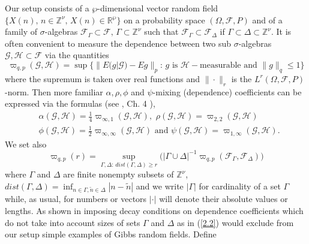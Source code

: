 Our setup consists of a  $\wp$-dimensional vector random field
$\{X(n),\, n\in{{\mathbb Z}}^\nu,\, X(n)\in{{\mathbb R}}^\wp\}$ on a probability space $({{\Omega}},{{\mathcal F}},P)$ and of a family of
${{\sigma}}$-algebras ${{\mathcal F}}_{{\Gamma}}\subset{{\mathcal F}},\, {{\Gamma}}\subset{{\mathbb Z}}^\nu$
such that ${{\mathcal F}}_{{\Gamma}}\subset{{\mathcal F}}_{{\Delta}}$ if ${{\Gamma}}\subset{{\Delta}}\subset{{\mathbb Z}}^\nu$.
It is often convenient to measure the dependence between two sub
${{\sigma}}$-algebras ${{\mathcal G}},{{\mathcal H}}\subset{{\mathcal F}}$ via the quantities
\begin{equation}\label{2.1}
\varpi_{q,p}({{\mathcal G}},{{\mathcal H}})=\sup\{\| E\big (g|{{\mathcal G}}\big)-Eg\|_p:\, g\,\,\mbox{is}\,\,
{{\mathcal H}}-\mbox{measurable and}\,\,\| g\|_q\leq 1\}
\end{equation}
where the supremum is taken over real functions and $\|\cdot\|_r$ is the
$L^r({{\Omega}},{{\mathcal F}},P)$-norm. Then more familiar ${{\alpha}},\rho,\phi$ and $\psi$-mixing 
(dependence) coefficients can be expressed via the formulas (see \cite{Bra},
Ch. 4 ),
\begin{eqnarray*}
&{{\alpha}}({{\mathcal G}},{{\mathcal H}})=\frac 14\varpi_{\infty,1}({{\mathcal G}},{{\mathcal H}}),\,\,\rho({{\mathcal G}},{{\mathcal H}})=\varpi_{2,2}
({{\mathcal G}},{{\mathcal H}})\\
&\phi({{\mathcal G}},{{\mathcal H}})=\frac 12\varpi_{\infty,\infty}({{\mathcal G}},{{\mathcal H}})\,\,\mbox{and}\,\,
\psi({{\mathcal G}},{{\mathcal H}})=\varpi_{1,\infty}({{\mathcal G}},{{\mathcal H}}).
\end{eqnarray*}
We set also
\begin{equation}\label{2.2}
\varpi_{q,p}(r)=\sup_{{{\Gamma}},{{\Delta}}:\,dist({{\Gamma}},{{\Delta}})\geq r}\big(
|{{\Gamma}}\cup{{\Delta}}|^{-1}\varpi_{q,p}({{\mathcal F}}_{{\Gamma}},{{\mathcal F}}_{{\Delta}})\big)
\end{equation}
where ${{\Gamma}}$ and ${{\Delta}}$ are finite nonempty subsets of ${{\mathbb Z}}^\nu$,
$dist({{\Gamma}},{{\Delta}})=\inf_{n\in{{\Gamma}},\tilde n\in{{\Delta}}}|n-\tilde n|$ and
we write $|{{\Gamma}}|$ for cardinality of a set ${{\Gamma}}$ while, as usual, for
 numbers or vectors $|\cdot |$ will denote their absolute values or lengths.
As shown in \cite{Do} imposing decay conditions on dependence coefficients
which do not take into account sizes of sets ${{\Gamma}}$ and ${{\Delta}}$ as in (\ref{2.2})
would exclude from our setup simple examples of Gibbs random fields. Define  
